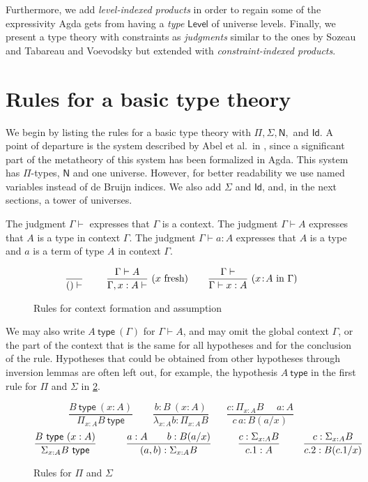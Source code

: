 \documentclass[11pt,a4paper]{article}
\theoremstyle{definition}
\newcommand{\Id}{\mathsf{Id}}
\newcommand{\NN}{\mathsf{N}}
\newcommand{\AgdaLevel}{\mathsf{Level}}
\newcommand{\type}{\mathsf{type}}
\newcommand{\mylam}[3]{\lambda_{#1:#2}#3}
\newcommand{\mypi}[3]{\Pi_{#1:#2}#3}
\newcommand{\mysig}[3]{\Sigma_{#1:#2}#3}
\newcommand{\app}[2]{{#1\,#2}} %
\begin{document}
Furthermore, we add
\emph{level-indexed products} in order to regain some of the expressivity Agda gets from having a \emph{type}
$\AgdaLevel$ of universe levels.
Finally, we present a type theory with constraints as \emph{judgments} similar to the ones by Sozeau and Tabareau \cite{SozeauTabareau:coq} and Voevodsky \cite{VV}  but extended with \emph{constraint-indexed products}.

\section{Rules for a basic type theory}\label{sec:basic}

We begin by listing the rules for a basic type theory
with $\Pi, \Sigma, \NN,$ and $\Id$. A point of departure is
the system described by Abel et al.\ in \cite{abel18}, since a
significant part of the metatheory of this system has been formalized in Agda.
This system has $\Pi$-types, $\NN$ and one universe.
However, for better readability we use named variables instead
of de Bruijn indices. We also add $\Sigma$ and $\Id$, and,
in the next sections, a tower of universes.

The judgment $\Gamma\vdash$ expresses that $\Gamma$ is a context.
The judgment $\Gamma\vdash A$ expresses that $A$ is a type in context $\Gamma$.
The judgment $\Gamma\vdash a:A$ expresses that $A$ is a type
and $a$ is a term of type $A$ in context $\Gamma$.

\begin{figure}[h]
  \caption{Rules for context formation and assumption}\label{fig:context}
$$
\frac{}{()\vdash}~~~~~~~
\frac{\Gamma\vdash A}{\Gamma,x:A\vdash}~(x~\text{fresh})~~~~~~
\frac{\Gamma\vdash}{\Gamma\vdash x:A}~(x\!:\! A~\text{in}~\Gamma)
\belowdisplayshortskip 0pt
$$
\end{figure}

We may also write $A~\type~(\Gamma)$ for $\Gamma\vdash A$,
and may omit the global context $\Gamma$,
or the part of the context that is the same for all hypotheses and for the
conclusion of the rule.
Hypotheses that could be obtained from other
hypotheses through inversion lemmas are often left out,
for example, the hypothesis $A~\type$ in the first rule for $\Pi$ and $\Sigma$
in \cref{fig:PiSig}.

\begin{figure}[h]
  \caption{Rules for $\Pi$ and $\Sigma$}\label{fig:PiSig}
$$
\frac{B~\type~(x:A)}{\mypi{x}{A}{B}~\type}~~~~~~~~~
\frac{b:B~(x:A)}{\mylam{x}{A}{b}:\mypi{x}{A}{B}}~~~~~~~~
\frac{c:\mypi{x}{A}{B}~~~~~~a:A}
     {\app{c}{a}:B(a/x)}
$$
$$
\frac{B~\type~(x:A)}{\mysig{x}{A}{B}~\type}~~~~~~~~~
\frac{a:A~~~~~~b:B(a/x)}{(a,b):\mysig{x}{A}{B}}~~~~~~~~
\frac{c:\mysig{x}{A}{B}}{c.1:A}~~~~~~~
\frac{c:\mysig{x}{A}{B}}{c.2:B(c.1/x)}
\belowdisplayshortskip -1pt
$$
\end{figure}
\end{document}
